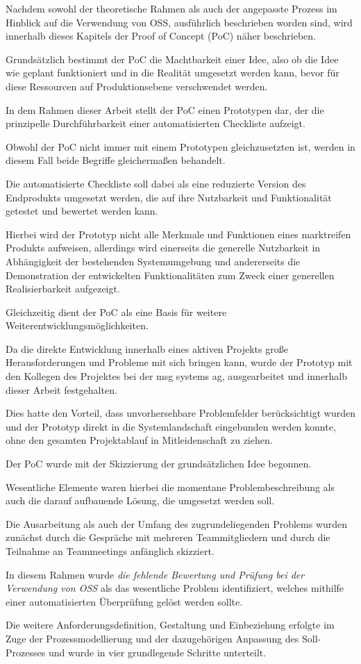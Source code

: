 Nachdem sowohl der theoretische Rahmen als auch der angepasste Prozess im Hinblick auf die Verwendung von OSS, ausführlich beschrieben worden sind, wird innerhalb dieses Kapitels der Proof of Concept (PoC) näher beschrieben. 

Grundsätzlich bestimmt der PoC die Machtbarkeit einer Idee, also ob die Idee wie geplant funktioniert und in die Realität umgesetzt werden kann, bevor für diese Ressourcen auf Produktionsebene verschwendet werden.  

In dem Rahmen dieser Arbeit stellt der PoC einen Prototypen dar, der die prinzipelle Durchführbarkeit einer automatisierten Checkliste aufzeigt.

Obwohl der PoC nicht immer mit einem Prototypen gleichzusetzten ist, werden in diesem Fall beide Begriffe gleichermaßen behandelt. 

Die automatisierte Checkliste soll dabei als eine reduzierte Version des Endprodukts umgesetzt werden, die auf ihre Nutzbarkeit und Funktionalität getestet und bewertet werden kann. 

Hierbei wird der Prototyp nicht alle Merkmale und Funktionen eines marktreifen Produkts aufweisen, allerdings wird einerseits die generelle Nutzbarkeit in Abhängigkeit der bestehenden Systemumgebung und andererseits die Demonstration der entwickelten Funktionalitäten zum Zweck einer generellen Realisierbarkeit aufgezeigt. 

Gleichzeitig dient der PoC als eine Basis für weitere Weiterentwicklungsmöglichkeiten. 

Da die direkte Entwicklung innerhalb eines aktiven Projekts große Herausforderungen und Probleme mit sich bringen kann, wurde der Prototyp mit den Kollegen des Projektes bei der msg systems ag, ausgearbeitet und innerhalb dieser Arbeit festgehalten. 

Dies hatte den Vorteil, dass unvorhersehbare Problemfelder berücksichtigt wurden und der Prototyp direkt in die Systemlandschaft eingebunden werden konnte, ohne den gesamten Projektablauf in Mitleidenschaft zu ziehen.

Der PoC wurde mit der Skizzierung der grundsätzlichen Idee begonnen. 

Wesentliche Elemente waren hierbei die momentane Problembeschreibung als auch die darauf aufbauende Lösung, die umgesetzt werden soll. 

Die Ausarbeitung als auch der Umfang des zugrundeliegenden Problems wurden zunächst durch die Gespräche mit mehreren Teammitgliedern und durch die Teilnahme an Teammeetings anfänglich skizziert.

In diesem Rahmen wurde \textit{die fehlende Bewertung und Prüfung bei der Verwendung von OSS} als das wesentliche Problem identifiziert, welches mithilfe einer automatisierten Überprüfung gelöst werden sollte.  

Die weitere Anforderungsdefinition, Gestaltung und Einbeziehung erfolgte im Zuge der Prozessmodellierung und der dazugehörigen Anpassung des Soll-Prozesses und wurde in vier grundlegende Schritte unterteilt.



